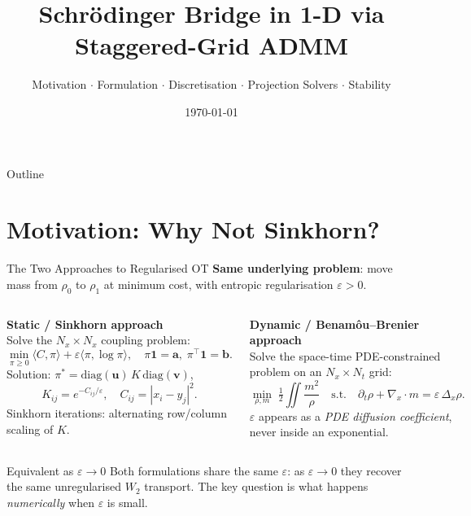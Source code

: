 \documentclass[10pt,aspectratio=169]{beamer}
\title[SB in 1-D via ADMM]{%
  \textbf{Schr\"{o}dinger Bridge in 1-D via Staggered-Grid ADMM}}
\subtitle{Motivation $\cdot$ Formulation $\cdot$ Discretisation $\cdot$
          Projection Solvers $\cdot$ Stability}
\author{}
\date{\today}
\newcommand{\eps}{\varepsilon}
\newcommand{\rhoO}{\rho_0}
\newcommand{\rhoT}{\rho_1}
\newcommand{\Lapx}{\Delta_x}          %
\newcommand{\divx}{\nabla_{\!x}\cdot} %
\begin{document}
\begin{frame}
  \titlepage
\end{frame}

\begin{frame}{Outline}
  \tableofcontents
\end{frame}

\section{Motivation: Why Not Sinkhorn?}

\begin{frame}{The Two Approaches to Regularised OT}
  \textbf{Same underlying problem}: move mass from $\rhoO$ to $\rhoT$
  at minimum cost, with entropic regularisation $\eps > 0$.

  \bigskip
  \begin{columns}[T]
    \textbf{Static / Sinkhorn approach}\\[4pt]
    Solve the $N_x \times N_x$ coupling problem:
    \[
      \min_{\pi \geq 0}\langle C,\pi\rangle + \eps\langle\pi,\log\pi\rangle,
      \quad
      \pi\mathbf{1}=\mathbf{a},\;\pi^\top\mathbf{1}=\mathbf{b}.
    \]
    Solution:
    $\pi^* = \mathrm{diag}(\mathbf{u})\,K\,\mathrm{diag}(\mathbf{v})$,
    \[
      K_{ij} = e^{-C_{ij}/\eps},
      \quad C_{ij} = |x_i - y_j|^2.
    \]
    Sinkhorn iterations: alternating row/column scaling of $K$.

    \textbf{Dynamic / Benam\^{o}u--Brenier approach}\\[4pt]
    Solve the space-time PDE-constrained problem on an
    $N_x \times N_t$ grid:
    \[
      \min_{\rho,m}\;\tfrac{1}{2}\iint\frac{m^2}{\rho}
      \quad\text{s.t.}\quad
      \partial_t\rho + \divx m = \eps\,\Lapx\rho.
    \]
    $\eps$ appears as a \emph{PDE diffusion coefficient},
    never inside an exponential.
  \end{columns}

  \bigskip
  \begin{block}{Equivalent as $\eps \to 0$}
    Both formulations share the same $\eps$: as $\eps\to 0$ they recover
    the same unregularised $W_2$ transport.  The key question is what
    happens \emph{numerically} when $\eps$ is small.
  \end{block}
\end{frame}
\end{document}
